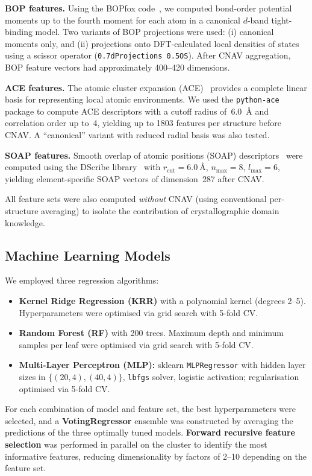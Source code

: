 \textbf{BOP features.} Using the BOPfox code~\cite{bopfox}, we computed bond-order potential moments up to the fourth moment for each atom in a canonical $d$-band tight-binding model. Two variants of BOP projections were used: (i) canonical moments only, and (ii) projections onto DFT-calculated local densities of states using a scissor operator (\texttt{0.7dProjections 0.5OS}). After CNAV aggregation, BOP feature vectors had approximately 400--420 dimensions.

\textbf{ACE features.} The atomic cluster expansion (ACE)~\cite{ace} provides a complete linear basis for representing local atomic environments. We used the \texttt{python-ace} package to compute ACE descriptors with a cutoff radius of~\SI{6.0}{\angstrom} and correlation order up to~4, yielding up to 1803 features per structure before CNAV. A ``canonical'' variant with reduced radial basis was also tested.

\textbf{SOAP features.} Smooth overlap of atomic positions (SOAP) descriptors~\cite{soap} were computed using the DScribe library~\cite{dscribe} with $r_\text{cut} = \SI{6.0}{\angstrom}$, $n_\text{max} = 8$, $l_\text{max} = 6$, yielding element-specific SOAP vectors of dimension~287 after CNAV.

All feature sets were also computed \textit{without} CNAV (using conventional per-structure averaging) to isolate the contribution of crystallographic domain knowledge.

\subsection{Machine Learning Models}

We employed three regression algorithms:

\begin{itemize}
  \item \textbf{Kernel Ridge Regression (KRR)} with a polynomial kernel (degrees 2--5). Hyperparameters were optimised via grid search with 5-fold CV.
  \item \textbf{Random Forest (RF)} with 200 trees. Maximum depth and minimum samples per leaf were optimised via grid search with 5-fold CV.
  \item \textbf{Multi-Layer Perceptron (MLP):} sklearn \texttt{MLPRegressor} with hidden layer sizes in $\{(20,4),(40,4)\}$, \texttt{lbfgs} solver, logistic activation; regularisation optimised via 5-fold CV.
\end{itemize}

For each combination of model and feature set, the best hyperparameters were selected, and a \textbf{VotingRegressor} ensemble was constructed by averaging the predictions of the three optimally tuned models. \textbf{Forward recursive feature selection} was performed in parallel on the cluster to identify the most informative features, reducing dimensionality by factors of 2--10 depending on the feature set.

